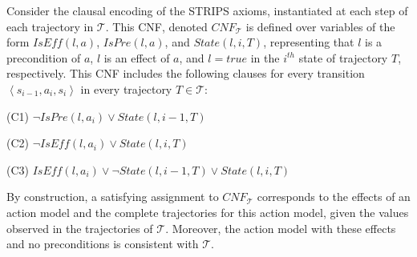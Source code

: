 \documentclass[letterpaper]{article} %
\newcommand{\tuple}[1]{\ensuremath{\left \langle #1 \right \rangle }}
\newcommand{\cnf}{\textit{CNF}}
\newcommand{\true}{\textit{true}}
\newcommand{\iseff}{\textit{IsEff}}
\newcommand{\ispre}{\textit{IsPre}}
\newcommand{\state}{\textit{State}}
\begin{document}
Consider the clausal encoding of the STRIPS axioms, instantiated at each step of each trajectory in $\mathcal{T}$. 
This CNF, denoted $\cnf_\mathcal{T}$ is defined over variables of the form $\iseff(l,a)$, $\ispre(l,a)$, and $\state(l,i,T)$, representing that 
$l$ is a precondition of $a$, 
$l$ is an effect of $a$, 
and $l=\true$ in the $i^{th}$ state of trajectory $T$, respectively.  
This CNF includes the following clauses for every transition $\tuple{s_{i-1},a_i,s_i}$ in every trajectory $T\in\mathcal{T}$:
\begin{compactitem}
\item (C1) $\neg \ispre(l,a_i)\vee \state(l,i-1,T)$
\item (C2) $\neg \iseff(l,a_i)\vee \state(l,i,T)$
\item (C3) $\iseff(l,a_i)\vee \neg \state(l,i-1,T) \vee \state(l,i,T)$
\end{compactitem}
By construction, a satisfying assignment to $\cnf_{\mathcal{T}}$ corresponds to the effects of an action model and the complete trajectories for this action model, given the values observed in the trajectories of $\mathcal{T}$. Moreover, the action model with these effects and no preconditions is consistent with $\mathcal{T}$. 
\end{document}

